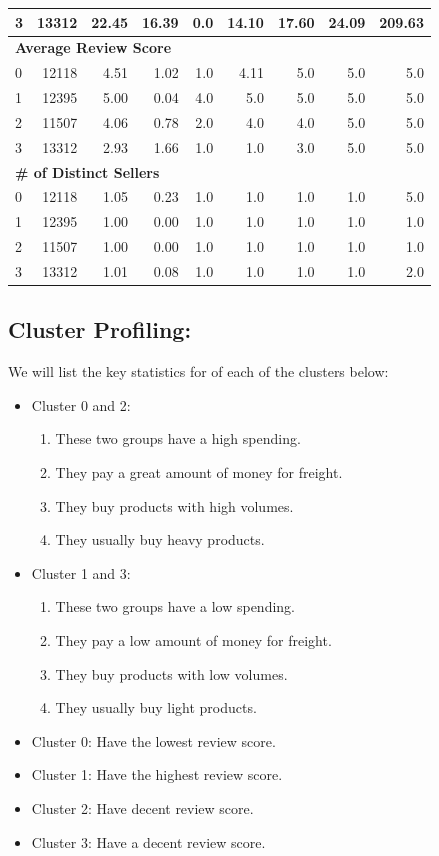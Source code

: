 \documentclass[a4paper,12pt]{article}
\begin{document}
\begin{longtable}{lrrrrrrrr}
3 & 13312 & 22.45 & 16.39 & 0.0 & 14.10 & 17.60 & 24.09 & 209.63 \\
\midrule
\multicolumn{9}{l}{\textbf{Average Review Score}} \\
\midrule
0 & 12118 & 4.51 & 1.02 & 1.0 & 4.11 & 5.0 & 5.0 & 5.0 \\
1 & 12395 & 5.00 & 0.04 & 4.0 & 5.0 & 5.0 & 5.0 & 5.0 \\
2 & 11507 & 4.06 & 0.78 & 2.0 & 4.0 & 4.0 & 5.0 & 5.0 \\
3 & 13312 & 2.93 & 1.66 & 1.0 & 1.0 & 3.0 & 5.0 & 5.0 \\
\midrule
\multicolumn{9}{l}{\textbf{\# of Distinct Sellers}} \\
\midrule
0 & 12118 & 1.05 & 0.23 & 1.0 & 1.0 & 1.0 & 1.0 & 5.0 \\
1 & 12395 & 1.00 & 0.00 & 1.0 & 1.0 & 1.0 & 1.0 & 1.0 \\
2 & 11507 & 1.00 & 0.00 & 1.0 & 1.0 & 1.0 & 1.0 & 1.0 \\
3 & 13312 & 1.01 & 0.08 & 1.0 & 1.0 & 1.0 & 1.0 & 2.0 \\
\bottomrule
\end{longtable}

\subsection{Cluster Profiling:}
We will list the key statistics for of each of the clusters below:
\begin{itemize}
    \item Cluster 0 and 2:
    \begin{enumerate}
        \item These two groups have a high spending.
        \item They pay a great amount of money for freight.
        \item They buy products with high volumes.
        \item They usually buy heavy products.
    \end{enumerate}
    \item Cluster 1 and 3:
    \begin{enumerate}
        \item These two groups have a low spending.
        \item They pay a low amount of money for freight.
        \item They buy products with low volumes.
        \item They usually buy light products.
    \end{enumerate}
    \item Cluster 0: Have the lowest review score.
    \item Cluster 1: Have the highest review score.
    \item Cluster 2: Have decent review score. 
    \item Cluster 3: Have a decent review score.
\end{itemize}
\end{document}
